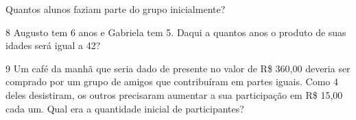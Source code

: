 Quantos alunos faziam parte do grupo inicialmente?

\begin{emptybox}
\vspace{5cm}
\end{emptybox}

\num{8} Augusto tem 6 anos e Gabriela tem 5. Daqui a quantos anos o produto
de suas idades será igual a 42?

\begin{emptybox}
\end{emptybox}

\pagebreak
\num{9} Um café da manhã que seria dado de presente no valor de R\$ 360,00
deveria ser comprado por um grupo de amigos que contribuíram em partes
iguais. Como 4 deles desistiram, os outros precisaram aumentar a sua
participação em R\$ 15,00 cada um. Qual era a quantidade inicial de 
participantes?

